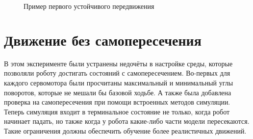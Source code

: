 \begin{figure}[ht]
    \caption[Пример первого устойчивого передвижения]{Пример первого устойчивого передвижения}\label{fig:robot_4.2}
\end{figure}


\section{Движение без самопересечения}\label{sec:ch3/sec5}
В этом эксперименте были устранены недочёты в настройке среды, которые позволяли роботу достигать состояний с самопересечением. Во-первых для каждого сервомотора были просчитаны максимальный и минимальный углы поворотов, которые не мешали бы базовой ходьбе. А также была добавлена проверка на самопересечения при помощи встроенных методов симуляции. Теперь симуляция входит в терминальное состояние не только, когда робот начинает падать, но также когда у робота какие-либо части модели пересекаются. Такие ограничения должны обеспечить обучение более реалистичных движений.


